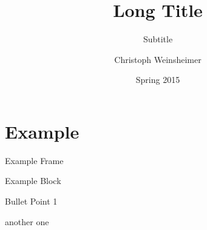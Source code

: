 \documentclass{beamer}
\title[Short Title]{Long Title}
\subtitle{Subtitle}
\author{Christoph Weinsheimer}
\institute[Uni Mainz]
{%
    Johannes Gutenberg-University Mainz
}
\date{Spring 2015}
\begin{document}



\section{Example}

\begin{frame}{Example Frame}
  \begin{block}{Example Block}
    \begin{wideitemize}
      \item Bullet Point 1
      \item another one
    \end{wideitemize}
  \end{block}
\end{frame}
\end{document}
